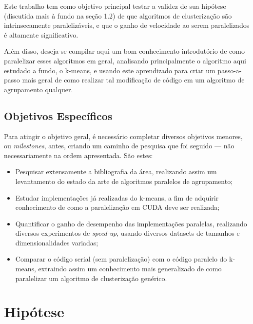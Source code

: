 \documentclass[12pt,
openright, 
oneside, %
a4paper,    %
brazil]{facom-ufu-abntex2}
\begin{document}
Este trabalho tem como objetivo principal testar a validez de sua hipótese (discutida mais à fundo na seção 1.2) de que algoritmos de clusterização são intrinsecamente paralelizáveis, e que o ganho de velocidade ao serem paralelizados é altamente significativo.

Além disso, deseja-se compilar aqui um bom conhecimento introdutório de como paralelizar esses algoritmos em geral, analisando principalmente o algoritmo aqui estudado a fundo, o k-means, e usando este aprendizado para criar um passo-a-passo mais geral de como realizar tal modificação de código em um algoritmo de agrupamento qualquer.




\subsection{Objetivos Específicos}

Para atingir o objetivo geral, é necessário completar diversos objetivos menores, ou \textit{milestones}, antes, criando um caminho de pesquisa que foi seguido --- não necessariamente na ordem apresentada. São estes:

\begin{itemize}
  \item Pesquisar extensamente a bibliografia da área, realizando assim um levantamento do estado da arte de algoritmos paralelos de agrupamento;
  
  \item Estudar implementações já realizadas do k-means, a fim de adquirir conhecimento de como a paralelização em CUDA deve ser realizada;
  
  \item Quantificar o ganho de desempenho das implementações paralelas, realizando diversos experimentos de \textit{speed-up}, usando diversos datasets de tamanhos e dimensionalidades variadas;
  
  \item Comparar o código serial (sem paralelização) com o código paralelo do k-means, extraindo assim um conhecimento mais generalizado de como paralelizar um algoritmo de clusterização genérico.
\end{itemize}




\section{Hipótese}
\end{document}
